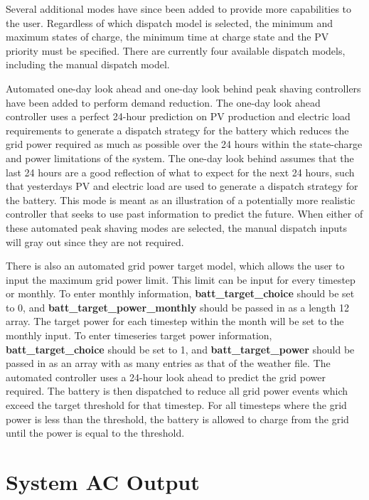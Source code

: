 \documentclass[12pt,letterpaper]{article}
\begin{document}
Several additional modes have since been added to provide more capabilities to the user.  Regardless of which dispatch model is selected, the minimum and maximum states of charge, the minimum time at charge state and the PV priority must be specified.  There are currently four available dispatch models, including the manual dispatch model.

Automated one-day look ahead and one-day look behind peak shaving controllers have been added to perform demand reduction. The one-day look ahead controller uses a perfect 24-hour prediction on PV production and electric load requirements to generate a dispatch strategy for the battery which reduces the grid power required as much as possible over the 24 hours within the state-charge and power limitations of the system.  The one-day look behind assumes that the last 24 hours are a good reflection of what to expect for the next 24 hours, such that yesterdays PV and electric load are used to generate a dispatch strategy for the battery.  This mode is meant as an illustration of a potentially more realistic controller that seeks to use past information to predict the future.  When either of these automated peak shaving modes are selected, the manual dispatch inputs will gray out since they are not required.  

There is also an automated grid power target model, which allows the user to input the maximum grid power limit. This limit can be input for every timestep or monthly.  To enter monthly information, \textbf{batt\_target\_choice} should be set to 0, and \textbf{batt\_target\_power\_monthly} should be passed in as a length 12 array.  The target power for each timestep within the month will be set to the monthly input.  To enter timeseries target power information, \textbf{batt\_target\_choice} should be set to 1, and \textbf{batt\_target\_power} should be passed in as an array with as many entries as that of the weather file.  The automated controller uses a 24-hour look ahead to predict the grid power required.  The battery is then dispatched to reduce all grid power events which exceed the target threshold for that timestep.  For all timesteps where the grid power is less than the threshold, the battery is allowed to charge from the grid until the power is equal to the threshold. 

\chapter{System AC Output}
\end{document}
